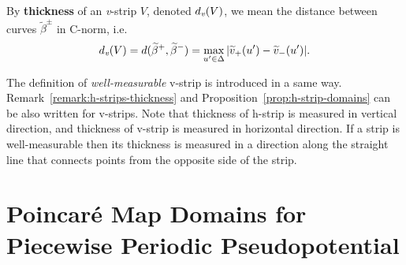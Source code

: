 \begin{definition}
\label{def:v-thickness}
	By {\bf thickness} of an \emph{v}-strip $V$, denoted $d_\emph{v}(V)$, we mean the distance between curves $\widetilde{\beta}^{\pm}$ in C-norm, i.e.
	\begin{equation}
		d_\emph{v}(V) = d(\widetilde{\beta}^+, \widetilde{\beta}^-) = \max \limits_{u' \in \Delta} |\widetilde{v}_+(u') - \widetilde{v}_-(u')|.
	\label{eq:v-thickness}
	\end{equation}
\end{definition}

The definition of {\it well-measurable} v-strip is introduced in a same way.
Remark~\ref{remark:h-strips-thickness} and Proposition~\ref{prop:h-strip-domains} can be also written for v-strips.
Note that thickness of h-strip is measured in vertical direction, and thickness of v-strip is measured in horizontal direction.
If a strip is well-measurable then its thickness is measured in a direction along the straight line that connects points from the opposite side of the strip.

\section{Poincar\'e Map Domains for Piecewise Periodic Pseudopotential}

